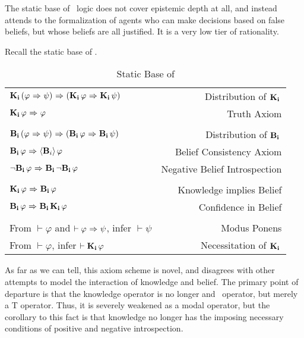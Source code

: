 The static base of \DASL\ logic does not cover epistemic depth at all, and instead attends to the formalization of agents who can make decisions based on false beliefs, but whose beliefs are all justified. It is a very low tier of rationality.

Recall the static base of \DASL.

\begin{table}[H]
	\begin{center}
		\begin{tabular}{| l r |}
			\hline
			$\mathbf{K}_{\mathbf{i}}\,(\varphi {\ \Rightarrow \ } \psi) {\ \Rightarrow \ } (\mathbf{K}_{\mathbf{i}}\,\varphi {\ \Rightarrow \ } \mathbf{K}_{\mathbf{i}}\,\psi)$ & Distribution of $\mathbf{K}_{\mathbf{i}}\,$ \\
			$\mathbf{K}_{\mathbf{i}}\,\varphi {\ \Rightarrow \ } \varphi$ & Truth Axiom \\
			&\\
			$\mathbf{B}_{\mathbf{i}}\,(\varphi {\ \Rightarrow \ } \psi) {\ \Rightarrow \ } (\mathbf{B}_{\mathbf{i}}\,\varphi {\ \Rightarrow \ } \mathbf{B}_{\mathbf{i}}\,\psi)$ & Distribution of $\mathbf{B}_{\mathbf{i}}\,$\\
			$\mathbf{B}_{\mathbf{i}}\,\varphi {\ \Rightarrow \ } \langle \mathbf{B}_{i} \rangle\,\varphi$ & Belief Consistency Axiom\\
			${\neg}\mathbf{B}_{\mathbf{i}}\,\varphi {\ \Rightarrow \ } \mathbf{B}_{\mathbf{i}}\,{\neg}\mathbf{B}_{\mathbf{i}}\,\varphi$ & Negative Belief Introspection\\
			&\\
			$\mathbf{K}_{\mathbf{i}}\,\varphi {\ \Rightarrow \ } \mathbf{B}_{\mathbf{i}}\,\varphi$ & Knowledge implies Belief \\
			$\mathbf{B}_{\mathbf{i}}\,\varphi {\ \Rightarrow \ } \mathbf{B}_{\mathbf{i}}\,\mathbf{K}_{\mathbf{i}}\,\varphi$ & Confidence in Belief\\
			&\\
			From $\vdash \varphi$ and $\vdash \varphi {\ \Rightarrow \ } \psi$, infer $\vdash\psi$ & Modus Ponens\\
			From $\vdash \varphi$, infer $\vdash \mathbf{K}_{\mathbf{i}}\,\varphi$ & Necessitation of $\mathbf{K}_{\mathbf{i}}\,$\\
			\hline
		\end{tabular}
		\caption{Static Base of \DASL}
	\end{center}
\end{table}

As far as we can tell, this axiom scheme is novel, and disagrees with other attempts to model the interaction of knowledge and belief. The primary point of departure is that the knowledge operator is no longer and \SFive\ operator, but merely a T operator. Thus, it is severely weakened as a modal operator, but the corollary to this fact is that knowledge no longer has the imposing necessary conditions of positive and negative introspection. 

